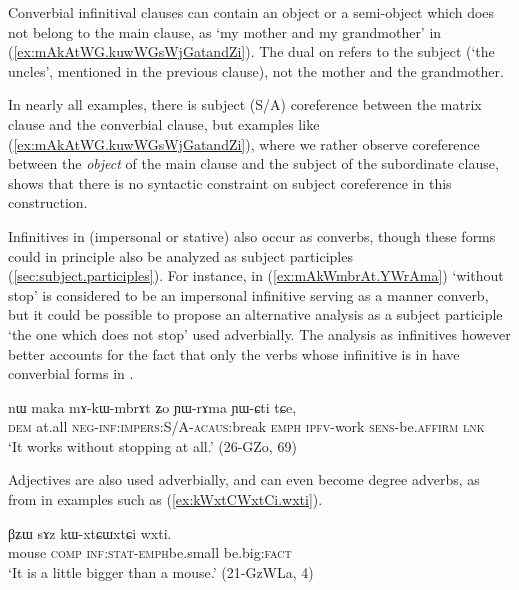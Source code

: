 Converbial infinitival clauses can contain an object or a semi-object which does not belong to the main clause, as  `my mother and my grandmother' in (\ref{ex:mAkAtWG.kuwWGsWjGatandZi}). The dual on  refers to the subject (`the uncles', mentioned in the previous clause), not the mother and the grandmother.

In nearly all examples, there is subject (S/A) coreference between the matrix clause and the converbial clause, but examples like (\ref{ex:mAkAtWG.kuwWGsWjGatandZi}), where we rather observe coreference between the \textit{object} of the main clause and the subject of the subordinate clause, shows that there is no syntactic constraint on subject coreference in this construction.


Infinitives in  (impersonal or stative) also occur as converbs, though these forms could in principle also be analyzed as subject participles (\ref{sec:subject.participles}). For instance, in (\ref{ex:mAkWmbrAt.YWrAma})  `without stop' is considered to be an impersonal infinitive serving as a manner converb, but it could be possible to propose an alternative analysis as a  subject participle `the one which does not stop' used adverbially.  The analysis as infinitives however better accounts for the fact that only the verbs whose infinitive is in  have converbial forms in .

\begin{exe}
\ex \label{ex:mAkWmbrAt.YWrAma}
 \gll nɯ maka mɤ-kɯ-mbrɤt ʑo ɲɯ-rɤma ɲɯ-ɕti tɕe,  \\
 \textsc{dem} at.all  \textsc{neg}-\textsc{inf:impers}:S/A-\textsc{acaus}:break \textsc{emph} \textsc{ipfv}-work \textsc{sens}-be.\textsc{affirm} \textsc{lnk} \\
 \glt `It works without stopping at all.' (26-GZo, 69)
\end{exe}

Adjectives are also used adverbially, and can even become degree adverbs, as  from  in examples such as (\ref{ex:kWxtCWxtCi.wxti}).

\begin{exe}
\ex \label{ex:kWxtCWxtCi.wxti}
 \gll βʑɯ sɤz kɯ-xtɕɯ\redp{}xtɕi wxti. \\
 mouse \textsc{comp} \textsc{inf:stat}-\textsc{emph}\redp{}be.small be.big:\textsc{fact} \\
 \glt `It is a little bigger than a mouse.' (21-GzWLa, 4)
\end{exe}

